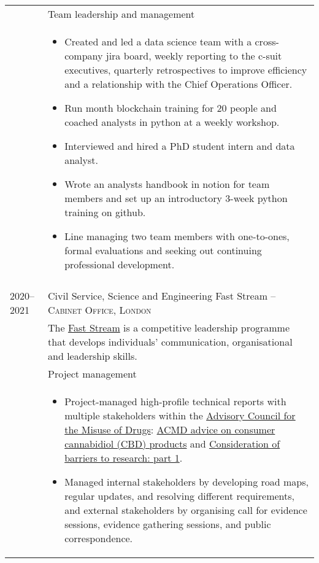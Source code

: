 \documentclass[a4paper,10pt]{article}
\newcommand{\tab}{\hspace{10 pt}}
\begin{document}
\begin{tabular}{p{2.25cm}|p{15cm}} 	
	 & \tab \large{Team leadership and management}\\
	 & \vspace{-0.07 in}\begin{itemize}
		\item Created and led a data science team with a cross-company jira board, weekly reporting to the c-suit executives, quarterly retrospectives to improve efficiency and a relationship with the Chief Operations Officer.
		\item Run month blockchain training for 20 people and coached analysts in python at a weekly workshop.
		\item Interviewed and hired a PhD student intern and data analyst. 
		\item Wrote an analysts handbook in notion for team members and set up an introductory 3-week python training on github.
		\item Line managing two team members with one-to-ones, formal evaluations and seeking out continuing professional development.   
	\end{itemize}\vspace{-0.15 in}\\ 
\multicolumn{2}{c}{}\\
%
%	 	 
	\textsc{2020--2021} & \large{Civil Service, Science and Engineering Fast Stream -- \textsc{Cabinet Office, London}}\\
 	 & The \href{https://www.faststream.gov.uk/}{Fast Stream} is a competitive leadership programme that develops individuals' communication, organisational and leadership skills.\vspace{0.05 in}\\
  	 & \tab \large{Project management}\\
 	 & \vspace{-0.07 in}\begin{itemize}
 	 	\item Project-managed high-profile technical reports with multiple stakeholders within the \href{https://www.gov.uk/government/organisations/advisory-council-on-the-misuse-of-drugs}{Advisory Council for the Misuse of Drugs}: \href{https://www.gov.uk/government/publications/acmd-advice-on-consumer-cannabidiol-cbd-products}{ACMD advice on consumer cannabidiol (CBD) products} and \href{https://www.gov.uk/government/publications/consideration-of-barriers-to-research-part-1}{Consideration of barriers to research: part 1}.
 	 	\item Managed internal stakeholders by developing road maps, regular updates, and resolving different requirements, and external stakeholders by organising call for evidence sessions, evidence gathering sessions, and public correspondence.

\end{itemize}
\end{tabular}
\end{document}

